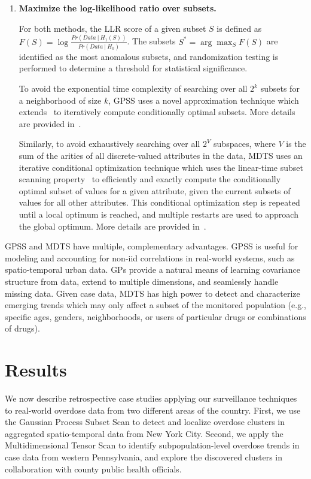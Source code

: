 \documentclass{acm_proc_article-sp}
\begin{document}
\begin{enumerate}
    \item \textbf{Maximize the log-likelihood ratio over subsets.} 
    
    For both methods, the LLR score of a given subset $S$ is defined as $F(S) = \log \frac{Pr(Data \:|\: H_1(S))}{Pr(Data \:|\: H_0)}$.  The subsets $S^\ast = \arg\max_S F(S)$ are identified as the most anomalous subsets, and randomization testing is performed to determine a threshold for statistical significance.
    
    To avoid the exponential time complexity of searching over all $2^k$ subsets for a neighborhood of size $k$, GPSS uses a novel approximation technique which extends~\cite{speakman2016penalized} to iteratively compute conditionally optimal subsets.  More details are provided in~\cite{herlands2017}.
    
    Similarly, to avoid exhaustively searching over all $2^V$ subspaces, where $V$ is the sum of the arities of all discrete-valued attributes in the data, MDTS uses an iterative conditional optimization technique which uses the linear-time subset scanning property~\cite{neill2012fast} to efficiently and exactly compute the conditionally optimal subset of values for a given attribute, given the current subsets of values for all other attributes.  This conditional optimization step is repeated until a local optimum is reached, and multiple restarts are used to approach the global optimum.  More details are provided in~\cite{neill2017overdose}. 
\end{enumerate}

GPSS and MDTS have multiple, complementary advantages.  GPSS is useful for modeling and accounting for non-iid correlations in real-world systems, such as spatio-temporal urban data.  GPs provide a natural means of learning covariance structure from data, extend to multiple dimensions, and seamlessly handle missing data. Given case data, MDTS has high power to detect and characterize emerging trends which may only affect a subset of the monitored population (e.g., specific ages, genders, neighborhoods, or users of particular drugs or combinations of drugs).

\section{Results}

We now describe retrospective case studies applying our surveillance 
techniques to real-world overdose data from two different areas of the country.  
First, we use the Gaussian Process Subset Scan to detect and localize 
overdose clusters in aggregated spatio-temporal data from New York City.  
Second, we apply the Multidimensional Tensor Scan to identify 
subpopulation-level overdose trends in case data from western Pennsylvania, 
and explore the discovered clusters in collaboration with county public 
health officials.
\end{document}
